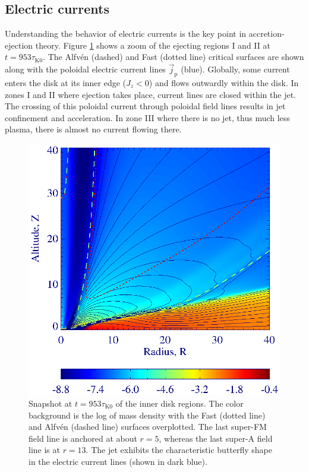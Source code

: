 \documentclass{aa}
\begin{document}
\subsection{Electric currents}

Understanding the behavior of electric currents is the key point in accretion-ejection theory. Figure \ref{current599} shows a zoom of the ejecting regions I and II at $t=953 \tau_\mathrm{K0}$. The Alfv\'en
(dashed) and Fast (dotted line) critical surfaces are shown along with the poloidal electric current lines $\vec j_\mathrm{p}$ (blue). Globally, some current enters the disk at its inner edge ($J_z <0$) and flows
outwardly within the disk. In zones I and II where ejection takes place, current lines are closed within the jet. The crossing of this poloidal current through poloidal field lines results in jet
confinement and acceleration. In zone III where there is no jet, thus much less plasma, there is almost no current flowing there.

\begin{figure}
   \centering \includegraphics[width=\columnwidth]{12633c07.eps}
   \caption{Snapshot at $t=953 \tau_\mathrm{K0}$ of the inner disk regions. The color background is the log of mass density with the Fast (dotted line) and Alfv\'en (dashed line) surfaces overplotted. The last super-FM
   field line is anchored at about $r=5$, whereas the last super-A field line is at $r=13$. The jet exhibits the characteristic butterfly shape in the electric current lines (shown in dark blue).}
   \label{current599}%
\end{figure}
\end{document}
